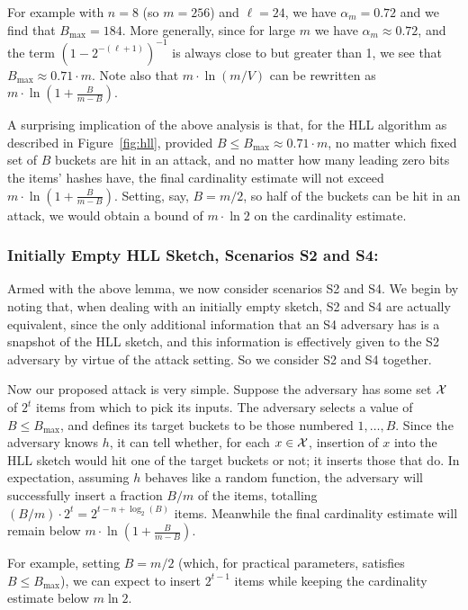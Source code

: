 \documentclass{article}
\begin{document}
For example with $n = 8$ (so $m=256$) and $\ell = 24$, we have $\alpha_m = 0.72$ and we find that $B_{\max}=184$. More generally, since for large $m$ we have $\alpha_m \approx 0.72$, and the term $(1-2^{-(\ell+1)})^{-1}$ is always close to but greater than 1, we see that $B_{\max} \approx  0.71\cdot m$. Note also that $m \cdot \ln (m/V)$ can be rewritten as $m \cdot \ln (1+\frac{B}{m-B})$.

A surprising implication of the above analysis is that, for the HLL algorithm as described in Figure~\ref{fig:hll}, provided $B \leq B_{\max} \approx  0.71\cdot m$, no matter which fixed set of $B$ buckets are hit in an attack, and no matter how many leading zero bits the items' hashes have, the final cardinality estimate will not exceed $m \cdot \ln (1+\frac{B}{m-B})$. Setting, say, $B = m/2$, so half of the buckets can be hit in an attack, we would obtain a bound of $m \cdot \ln 2$ on the cardinality estimate.

\subsubsection{Initially Empty HLL Sketch, Scenarios S2 and S4:} 

Armed with the above lemma, we now consider scenarios S2 and S4. We begin by noting that, when dealing with an initially empty sketch, S2 and S4 are actually equivalent, since the only additional information that an S4 adversary has is a snapshot of the HLL sketch, and this information is effectively given to the S2 adversary by virtue of the attack setting. So we consider S2 and S4 together.

Now our proposed attack is very simple. Suppose the adversary has some set ${\cal X}$ of $2^t$ items from which to pick its inputs. The adversary selects a value of $B \leq B_{\max}$, and defines its target buckets to be those numbered $1,\ldots,B$. Since the adversary knows $h$, it can tell whether, for each $x \in {\cal X}$, insertion of $x$ into the HLL sketch would hit one of the target buckets or not; it inserts those that do. In expectation, assuming $h$ behaves like a random function, the adversary will successfully insert a fraction $B/m$ of the items, totalling $(B/m)\cdot 2^t = 2^{t-n+\log_2(B)}$ items. Meanwhile the final cardinality estimate will remain below $m \cdot \ln (1+\frac{B}{m-B})$. 

For example, setting $B = m/2$ (which, for practical parameters, satisfies $B \leq B_{\max}$), we can expect to insert $2^{t-1}$ items while keeping the cardinality estimate below $m \ln 2$.
\end{document}
